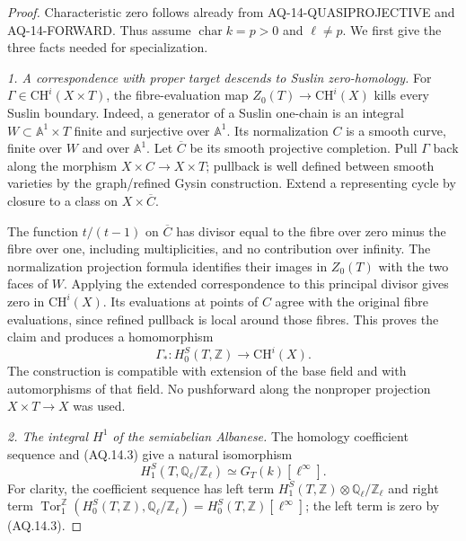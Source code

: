 \begin{proof}
Characteristic zero follows already from
AQ-14-QUASIPROJECTIVE and AQ-14-FORWARD. Thus assume
$\operatorname{char}k=p>0$ and $\ell\ne p$.
We first give the three facts needed for specialization.

\emph{1. A correspondence with proper target descends to
Suslin zero-homology.}
For $\Gamma\in\mathrm{CH}^i(X\times T)$, the fibre-evaluation
map $Z_0(T)\to\mathrm{CH}^i(X)$ kills every Suslin boundary.
Indeed, a generator of a Suslin one-chain is an integral
$W\subset\mathbb A^1\times T$ finite and surjective over
$\mathbb A^1$. Its normalization $C$ is a smooth curve,
finite over $W$ and over $\mathbb A^1$. Let $\overline C$
be its smooth projective completion. Pull $\Gamma$ back
along the morphism $X\times C\to X\times T$; pullback is
well defined between smooth varieties by the graph/refined
Gysin construction. Extend a representing cycle by closure
to a class on $X\times\overline C$.

The function $t/(t-1)$ on $\overline C$ has divisor equal
to the fibre over zero minus the fibre over one, including
multiplicities, and no contribution over infinity. The
normalization projection formula identifies their images
in $Z_0(T)$ with the two faces of $W$. Applying the extended
correspondence to this principal divisor gives zero in
$\mathrm{CH}^i(X)$. Its evaluations at points of $C$ agree
with the original fibre evaluations, since refined pullback
is local around those fibres. This proves the claim and
produces a homomorphism
\[
 \Gamma_*:H_0^S(T,\mathbb Z)\longrightarrow\mathrm{CH}^i(X).
                                                               \tag{AQ.14.4}
\]
The construction is compatible with extension of the base
field and with automorphisms of that field. No pushforward
along the nonproper projection $X\times T\to X$ was used.

\emph{2. The integral $H^1$ of the semiabelian Albanese.}
The homology coefficient sequence and (AQ.14.3) give a
natural isomorphism
\[
 H_1^S(T,\mathbb Q_\ell/\mathbb Z_\ell)
             \simeq G_T(k)[\ell^\infty].                    \tag{AQ.14.5}
\]
For clarity, the coefficient sequence has left term
$H_1^S(T,\mathbb Z)\otimes\mathbb Q_\ell/\mathbb Z_\ell$
and right term
$\operatorname{Tor}_1^{\mathbb Z}(H_0^S(T,\mathbb Z),
\mathbb Q_\ell/\mathbb Z_\ell)=H_0^S(T,\mathbb Z)[\ell^\infty]$;
the left term is zero by (AQ.14.3).


\end{proof}
